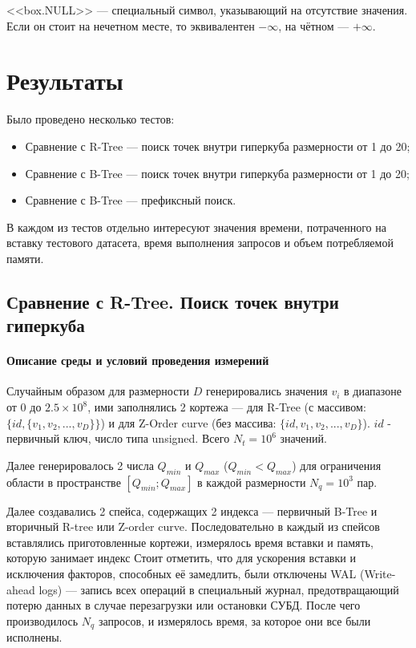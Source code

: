 <<box.NULL>> --- специальный символ, указывающий на отсутствие значения. Если он стоит на нечетном месте, то эквивалентен $-\infty$, на чётном --- $+\infty$.

\chapter{Результаты} \label{chapt4}
Было проведено несколько тестов:
\begin{itemize}
	\item Сравнение с R-Tree --- поиск точек внутри гиперкуба
	размерности от 1 до 20;
	\item Сравнение с B-Tree --- поиск точек внутри гиперкуба
	размерности от 1 до 20;
	\item Сравнение с B-Tree --- префиксный поиск.
\end{itemize}

В каждом из тестов отдельно интересуют значения времени, потраченного на вставку тестового датасета, время выполнения запросов
и объем потребляемой памяти.

\section{Сравнение с R-Tree. Поиск точек внутри гиперкуба}

\subsubsection{Описание среды и условий проведения измерений}

Случайным образом для размерности $D$ генерировались значения $v_i$ в диапазоне от $0$ до $2.5 \times 10^8$,
ими заполнялись 2 кортежа --- для R-Tree (с массивом: $\{id, \{v_1, v_2, ..., v_D\}\}$) и для Z-Order curve (без массива: $\{id, v_1, v_2, ..., v_D\}$). $id$ - первичный ключ, число типа unsigned.
Всего $N_{t} = 10^6$ значений.

Далее генерировалось 2 числа $Q_{min}$ и $Q_{max}$ ($Q_{min} < Q_{max}$) для ограничения области в пространстве $[Q_{min}; Q_{max}]$ в каждой размерности $N_{q} = 10^3$ пар.

Далее создавались 2 спейса, содержащих 2 индекса --- первичный B-Tree и вторичный R-tree или Z-order curve. Последовательно в каждый из спейсов вставлялись приготовленные кортежи,
измерялось время вставки и память, которую занимает индекс
Стоит отметить, что для ускорения вставки и исключения факторов,
способных её замедлить, были отключены WAL (Write-ahead logs) ---
запись всех операций в специальный журнал, предотвращающий потерю данных в случае перезагрузки или остановки СУБД.
После чего производилось $N_{q}$ запросов,
и измерялось время, за которое они все были исполнены.

